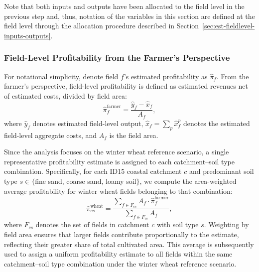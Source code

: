 \documentclass[12pt]{article}
\begin{document}
Note that both inputs and outputs have been allocated to the field level in the previous step and, thus, notation of the variables in this section are defined at the field level through the allocation procedure described in Section~\ref{sec:est-fieldlevel-inputs-outputs}.

\subsubsection{Field-Level 
Profitability from the Farmer's Perspective}
For notational simplicity, denote field $f$'s estimated profitability as $\hat{\pi}_f$.
From the farmer's perspective, field-level profitability is defined as
estimated revenues net of estimated costs, divided by field area:
\begin{equation}
    \hat{\pi}_f^{\text{farmer}} = \frac{\hat{y}_f - \hat{x}_f}{A_f},
\end{equation}
where $\hat{y}_f$ denotes estimated
field-level output, $\hat{x}_f = \sum_p \hat{x}_f^p$ denotes the estimated field-level aggregate costs, and $A_f$ is the field area.

Since the analysis focuses on the winter wheat reference scenario,
a single representative profitability estimate is assigned to each
catchment--soil type combination.
Specifically, for each ID15 coastal catchment $c$ and predominant soil
type $s \in \{$fine sand, coarse sand, loamy soil$\}$, we compute the
area-weighted average profitability for winter wheat fields
belonging to that combination:
\begin{equation}
\bar{\pi}^{\text{wheat}}_{cs} = \frac{\sum_{f \in F_{cs}}
A_f \cdot \hat{\pi}^{\text{farmer}}_f}{\sum_{f \in F_{cs}} A_f},
\end{equation}
where $F_{cs}$ denotes the set of fields in catchment $c$ with soil
type $s$.
Weighting by field area ensures that larger fields contribute
proportionally to the estimate, reflecting their greater share of
total cultivated area.
This average is subsequently used to assign a uniform profitability
estimate to all fields within the same catchment--soil type combination
under the winter wheat reference scenario.
\end{document}

